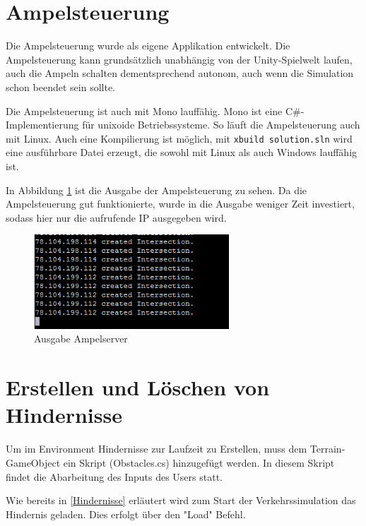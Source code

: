 \section{Ampelsteuerung}
\label{Ampelsteuerung}

Die Ampelsteuerung wurde als eigene Applikation entwickelt. Die Ampelsteuerung kann grundsätzlich unabhängig von der Unity-Spielwelt laufen, auch die Ampeln schalten dementsprechend autonom, auch wenn die Simulation schon beendet sein sollte.


Die Ampelsteuerung ist auch mit Mono lauffähig. Mono ist eine C\#-Implementierung für unixoide Betriebssysteme. So läuft die Ampelsteuerung auch mit Linux. Auch eine Kompilierung ist möglich, mit \texttt{xbuild solution.sln} wird eine ausführbare Datei erzeugt, die sowohl mit Linux als auch Windows lauffähig ist.

In Abbildung \ref{img:ampel} ist die Ausgabe der Ampelsteuerung zu sehen. Da die Ampelsteuerung gut funktionierte, wurde in die Ausgabe weniger Zeit investiert, sodass hier nur die aufrufende IP ausgegeben wird.

\begin{figure}[H]
\begin{center}
	\includegraphics[width=0.65\textwidth]{BilderAllgemein/ampelserver.png}
\end{center}
	\caption{Ausgabe Ampelserver}
	\label{img:ampel}
\end{figure}

\section{Erstellen und Löschen von Hindernisse}

Um im Environment Hindernisse zur Laufzeit zu Erstellen, muss dem Terrain-GameObject ein Skript (Obstacles.cs) hinzugefügt werden. In diesem Skript findet die Abarbeitung des Inputs des Users statt.

Wie bereits in \ref{Hindernisse} erläutert wird zum Start der Verkehrssimulation das Hindernis geladen. Dies erfolgt über den "Load" Befehl.

